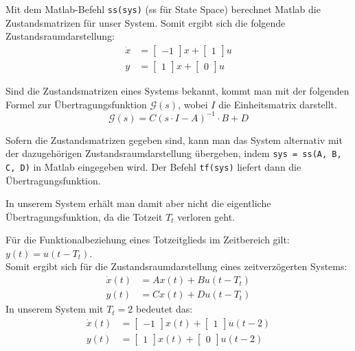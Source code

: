 Mit dem Matlab-Befehl \texttt{ss(sys)} (ss für State Space) berechnet Matlab die Zustandsmatrizen für unser System. Somit ergibt sich die folgende Zustandsraumdarstellung:
\begin{align*}
    \dot x & = \begin{bmatrix}
        -1
    \end{bmatrix}x + \begin{bmatrix}
        1
    \end{bmatrix}u \\
    y & = \begin{bmatrix}
        1
    \end{bmatrix}x + \begin{bmatrix}
        0
    \end{bmatrix}u
\end{align*}

Sind die Zustandsmatrizen eines Systems bekannt, kommt man mit der folgenden Formel zur Übertragungsfunktion $\mathcal{G}(s)$, wobei $I$ die Einheitsmatrix darstellt.
\[
    \mathcal{G}(s) = C(s \cdot I - A)^{-1} \cdot B + D
\]

Sofern die Zustandsmatrizen gegeben sind, kann man das System alternativ mit der dazugehörigen Zustandsraumdarstellung übergeben, indem \texttt{sys = ss(A, B, C, D)} in Matlab eingegeben wird. Der Befehl \texttt{tf(sys)} liefert dann die Übertragungsfunktion.

In unserem System erhält man damit aber nicht die eigentliche Übertragungsfunktion, da die Totzeit $T_t$ verloren geht.

Für die Funktionalbeziehung eines Totzeitglieds im Zeitbereich gilt: $y(t) = u(t-T_t)$. \\
Somit ergibt sich für die Zustandsraumdarstellung eines zeitverzögerten Systems:
\begin{align*}
    \dot x(t) & = Ax(t) + Bu(t - T_t) \nonumber \\
    y(t) & = Cx(t) + Du(t - T_t)
\end{align*}
In unserem System mit $T_t = 2$ bedeutet das:
\begin{align*}
    \dot x(t) & = \begin{bmatrix}
        -1
    \end{bmatrix}x(t) + \begin{bmatrix}
        1
    \end{bmatrix}u(t - 2) \nonumber \\
    y(t) & = \begin{bmatrix}
        1
    \end{bmatrix}x(t) + \begin{bmatrix}
        0
    \end{bmatrix}u(t - 2)
\end{align*}

